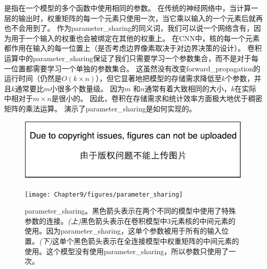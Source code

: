 是指在一个模型的多个函数中使用相同的参数。
在传统的神经网络中，当计算一层的输出时，权重矩阵的每一个元素只使用一次，当它乘以输入的一个元素后就再也不会用到了。
作为\gls{parameter_sharing}的同义词，我们可以说一个网络含有，因为用于一个输入的权重也会被绑定在其他的权重上。
在\gls{CNN}中，核的每一个元素都作用在输入的每一位置上（是否考虑边界像素取决于对边界决策的设计）。
卷积运算中的\gls{parameter_sharing}保证了我们只需要学习一个参数集合，而不是对于每一位置都需要学习一个单独的参数集合。
这虽然没有改变\gls{forward_propagation}的运行时间（仍然是$O(k\times n)$），但它显著地把模型的存储需求降低至$k$个参数，并且$k$通常要比$m$小很多个数量级。
因为$m$ 和$n$通常有着大致相同的大小，$k$在实际中相对于$m\times n$是很小的。
因此，卷积在存储需求和统计效率方面极大地优于稠密矩阵的乘法运算。
演示了\gls{parameter_sharing}是如何实现的。
\begin{figure}[!htb]
\ifOpenSource
\centerline{\includegraphics{figure.pdf}}
\else
\centerline{\texttt{[image: Chapter9/figures/parameter\_sharing]}}
\fi
\caption{\gls{parameter_sharing}。黑色箭头表示在两个不同的模型中使用了特殊参数的连接。\emph{(上)}黑色箭头表示在卷积模型中3元素核的中间元素的使用。因为\gls{parameter_sharing}，这单个参数被用于所有的输入位置。\emph{(下)}这单个黑色箭头表示在全连接模型中权重矩阵的中间元素的使用。这个模型没有使用\gls{parameter_sharing}，所以参数只使用了一次。}
\label{fig:chap9_parameter_sharing}
\end{figure}
 
 
